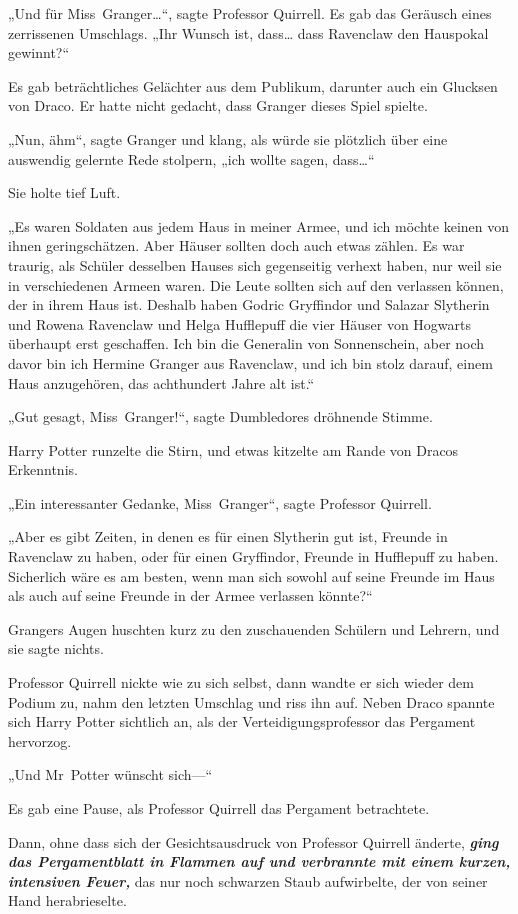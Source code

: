{„Und für Miss~Granger…“, sagte Professor Quirrell. Es gab das Geräusch eines zerrissenen Umschlags. „Ihr Wunsch ist, dass… dass Ravenclaw den Hauspokal gewinnt?“

Es gab beträchtliches Gelächter aus dem Publikum, darunter auch ein Glucksen von Draco. Er hatte nicht gedacht, dass Granger dieses Spiel spielte.

„Nun, ähm“, sagte Granger und klang, als würde sie plötzlich über eine auswendig gelernte Rede stolpern, „ich wollte sagen, dass…“

Sie holte tief Luft.

„Es waren Soldaten aus jedem Haus in meiner Armee, und ich möchte keinen von ihnen geringschätzen. Aber Häuser sollten doch auch etwas zählen. Es war traurig, als Schüler desselben Hauses sich gegenseitig verhext haben, nur weil sie in verschiedenen Armeen waren. Die Leute sollten sich auf den verlassen können, der in ihrem Haus ist. Deshalb haben Godric Gryffindor und Salazar Slytherin und Rowena Ravenclaw und Helga Hufflepuff die vier Häuser von Hogwarts überhaupt erst geschaffen. Ich bin die Generalin von Sonnenschein, aber noch davor bin ich Hermine Granger aus Ravenclaw, und ich bin stolz darauf, einem Haus anzugehören, das achthundert Jahre alt ist.“

„Gut gesagt, Miss~Granger!“, sagte Dumbledores dröhnende Stimme.

Harry Potter runzelte die Stirn, und etwas kitzelte am Rande von Dracos Erkenntnis.

„Ein interessanter Gedanke, Miss~Granger“, sagte Professor Quirrell.

„Aber es gibt Zeiten, in denen es für einen Slytherin gut ist, Freunde in Ravenclaw zu haben, oder für einen Gryffindor, Freunde in Hufflepuff zu haben. Sicherlich wäre es am besten, wenn man sich sowohl auf seine Freunde im Haus als auch auf seine Freunde in der Armee verlassen könnte?“

Grangers Augen huschten kurz zu den zuschauenden Schülern und Lehrern, und sie sagte nichts.

Professor Quirrell nickte wie zu sich selbst, dann wandte er sich wieder dem Podium zu, nahm den letzten Umschlag und riss ihn auf. Neben Draco spannte sich Harry Potter sichtlich an, als der Verteidigungsprofessor das Pergament hervorzog.

„Und Mr~Potter wünscht sich—“

Es gab eine Pause, als Professor Quirrell das Pergament betrachtete.

Dann, ohne dass sich der Gesichtsausdruck von Professor Quirrell änderte, \textbf{\emph{ging das Pergamentblatt in Flammen auf und verbrannte mit einem kurzen, intensiven Feuer,}} das nur noch schwarzen Staub aufwirbelte, der von seiner Hand herabrieselte.

}
